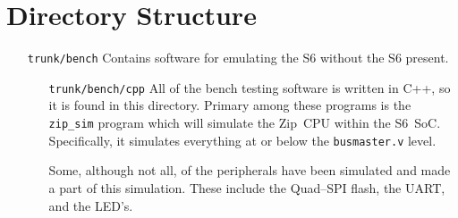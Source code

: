 \documentclass{gqtekspec}
\begin{document}
\section{Directory Structure}
\begin{itemize}
\item[{\tt trunk/bench}] Contains software for emulating the S6 without the S6
	present.
  \begin{itemize}
	\item[{\tt trunk/bench/cpp}]  All of the bench testing software is
		written in C++, so it is found in this directory.  Primary
		among these programs is the {\tt zip\_sim} program which will
		simulate the Zip~CPU within the S6~SoC.  Specifically, it
		simulates everything at or below the {\tt busmaster.v} level.

		Some, although not all, of the peripherals have been simulated
		and made a part of this simulation.  These include the
		Quad--SPI flash, the UART, and the LED's.


\end{itemize}
\end{itemize}
\end{document}

